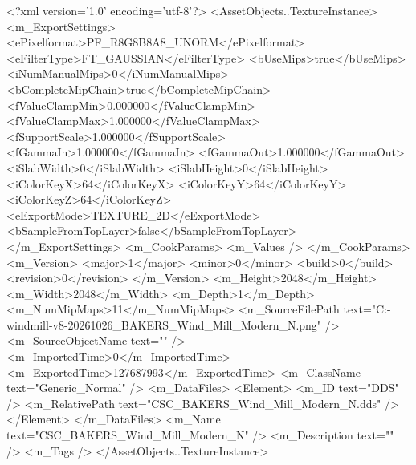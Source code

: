 <?xml version='1.0' encoding='utf-8'?>
<AssetObjects..TextureInstance>
  <m_ExportSettings>
    <ePixelformat>PF_R8G8B8A8_UNORM</ePixelformat>
    <eFilterType>FT_GAUSSIAN</eFilterType>
    <bUseMips>true</bUseMips>
    <iNumManualMips>0</iNumManualMips>
    <bCompleteMipChain>true</bCompleteMipChain>
    <fValueClampMin>0.000000</fValueClampMin>
    <fValueClampMax>1.000000</fValueClampMax>
    <fSupportScale>1.000000</fSupportScale>
    <fGammaIn>1.000000</fGammaIn>
    <fGammaOut>1.000000</fGammaOut>
    <iSlabWidth>0</iSlabWidth>
    <iSlabHeight>0</iSlabHeight>
    <iColorKeyX>64</iColorKeyX>
    <iColorKeyY>64</iColorKeyY>
    <iColorKeyZ>64</iColorKeyZ>
    <eExportMode>TEXTURE_2D</eExportMode>
    <bSampleFromTopLayer>false</bSampleFromTopLayer>
  </m_ExportSettings>
  <m_CookParams>
    <m_Values />
  </m_CookParams>
  <m_Version>
    <major>1</major>
    <minor>0</minor>
    <build>0</build>
    <revision>0</revision>
  </m_Version>
  <m_Height>2048</m_Height>
  <m_Width>2048</m_Width>
  <m_Depth>1</m_Depth>
  <m_NumMipMaps>11</m_NumMipMaps>
  <m_SourceFilePath text="C:\Users\Shadow\Desktop\Codex\modern-windmill-v8-20261026\export\textures\CSC_BAKERS_Wind_Mill_Modern_N.png" />
  <m_SourceObjectName text="" />
  <m_ImportedTime>0</m_ImportedTime>
  <m_ExportedTime>127687993</m_ExportedTime>
  <m_ClassName text="Generic_Normal" />
  <m_DataFiles>
    <Element>
      <m_ID text="DDS" />
      <m_RelativePath text="CSC_BAKERS_Wind_Mill_Modern_N.dds" />
    </Element>
  </m_DataFiles>
  <m_Name text="CSC_BAKERS_Wind_Mill_Modern_N" />
  <m_Description text="" />
  <m_Tags />
</AssetObjects..TextureInstance>